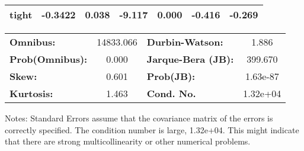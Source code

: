 \begin{center}
\begin{tabular}{lcccccc}
\textbf{tight}                    &      -0.3422  &        0.038     &    -9.117  &         0.000        &       -0.416    &       -0.269     \\
\bottomrule
\end{tabular}
\begin{tabular}{lclc}
\textbf{Omnibus:}       & 14833.066 & \textbf{  Durbin-Watson:     } &    1.886  \\
\textbf{Prob(Omnibus):} &    0.000  & \textbf{  Jarque-Bera (JB):  } &  399.670  \\
\textbf{Skew:}          &    0.601  & \textbf{  Prob(JB):          } & 1.63e-87  \\
\textbf{Kurtosis:}      &    1.463  & \textbf{  Cond. No.          } & 1.32e+04  \\
\bottomrule
\end{tabular}
\end{center}

Notes: \newline
 [1] Standard Errors assume that the covariance matrix of the errors is correctly specified. \newline
 [2] The condition number is large, 1.32e+04. This might indicate that there are \newline
 strong multicollinearity or other numerical problems.